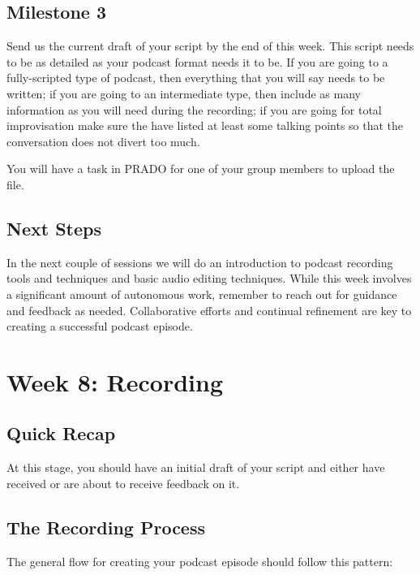 \documentclass[
  letterpaper,
  DIV=11,
  numbers=noendperiod]{scrreprt}
\begin{document}
\section{Milestone 3}\label{milestone-3}

Send us the current draft of your script by the end of this week. This
script needs to be as detailed as your podcast format needs it to be. If
you are going to a fully-scripted type of podcast, then everything that
you will say needs to be written; if you are going to an intermediate
type, then include as many information as you will need during the
recording; if you are going for total improvisation make sure the have
listed at least some talking points so that the conversation does not
divert too much.

You will have a task in PRADO for one of your group members to upload
the file.

\section{Next Steps}\label{next-steps-7}

In the next couple of sessions we will do an introduction to podcast
recording tools and techniques and basic audio editing techniques. While
this week involves a significant amount of autonomous work, remember to
reach out for guidance and feedback as needed. Collaborative efforts and
continual refinement are key to creating a successful podcast episode.

\chapter{Week 8: Recording}\label{week-8-recording}

\section{Quick Recap}\label{quick-recap-2}

At this stage, you should have an initial draft of your script and
either have received or are about to receive feedback on it.

\section{The Recording Process}\label{the-recording-process}

The general flow for creating your podcast episode should follow this
pattern:
\end{document}
